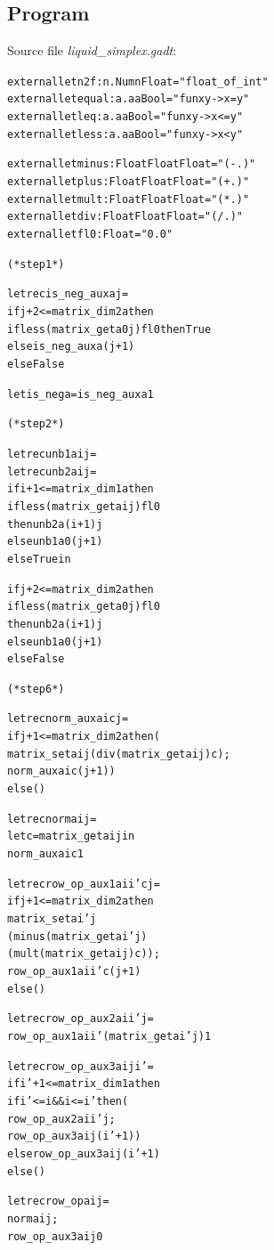 \documentclass{article}
\newcommand{\tmem}[1]{{\em #1\/}}
\newcommand{\tmverbatim}[1]{{\ttfamily{#1}}}
\newenvironment{tmcode}[1][]{\begin{alltt}}{\end{alltt}}
\begin{document}
\subsection{Program \tmverbatim{simplex}}

Source file {\tmem{liquid\_simplex.gadt}}:
\begin{tmcode}
external let n2f : n. Num n  Float = "float_of_int"
external let equal : a. a  a  Bool = "fun x y -> x = y"
external let leq : a. a  a  Bool = "fun x y -> x <= y"
external let less : a. a  a  Bool = "fun x y -> x < y"

external let minus : Float  Float  Float = "(-.)"
external let plus : Float  Float  Float = "(+.)"
external let mult : Float  Float  Float = "( *. )"
external let div : Float  Float  Float = "( /. )"
external let fl0 : Float = "0.0"

(* step 1 *)

let rec is_neg_aux a j =
  if j + 2 <= matrix_dim2 a then
    if less (matrix_get a 0 j) fl0 then True
    else is_neg_aux a (j+1)
  else False

let is_neg a = is_neg_aux a 1

(* step 2 *)

let rec unb1 a i j =
  let rec unb2 a i j =
    if i + 1 <= matrix_dim1 a then
      if less (matrix_get a i j) fl0
      then unb2 a (i+1) j
      else unb1 a 0 (j+1)
    else True in

  if j + 2 <= matrix_dim2 a then
    if less (matrix_get a 0 j) fl0
    then unb2 a (i+1) j
    else unb1 a 0 (j+1)
  else False

(* step 6 *)

let rec norm_aux a i c j =
  if j + 1 <= matrix_dim2 a then (
    matrix_set a i j (div (matrix_get a i j) c);
    norm_aux a i c (j+1))
  else ()

let rec norm a i j =
  let c = matrix_get a i j in
  norm_aux a i c 1

let rec row_op_aux1 a i i' c j =
  if j + 1 <= matrix_dim2 a then
    matrix_set a i' j
      (minus (matrix_get a i' j)
        (mult (matrix_get a i j) c));
    row_op_aux1 a i i' c (j+1)
  else ()

let rec row_op_aux2 a i i' j =
  row_op_aux1 a i i' (matrix_get a i' j) 1

let rec row_op_aux3 a i j i' =
  if i' + 1 <= matrix_dim1 a then
    if i' <= i && i <= i' then (
      row_op_aux2 a i i' j;
      row_op_aux3 a i j (i'+1))
    else row_op_aux3 a i j (i'+1)
  else ()

let rec row_op a i j =
  norm a i j;
  row_op_aux3 a i j 0


\end{tmcode}
\end{document}
